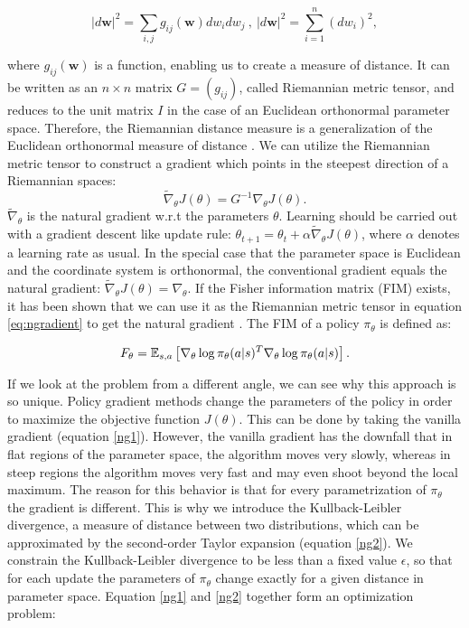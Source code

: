 \begin{equation}
	\label{eq:riem}
	|d\textbf{w}|^2 = \sum_{i,j}g_{ij}(\textbf{w}) dw_i dw_j ~,~ |d\textbf{w}|^2 = \sum_{i=1}^{n}(dw_i)^2,
\end{equation}

\noindent where $g_{ij}(\textbf{w})$ is a function, enabling us to create a measure of distance. It can be written as an $n \times n$ matrix $G = (g_{ij})$, called Riemannian metric tensor, and reduces to the unit matrix $I$ in the case of an Euclidean orthonormal parameter space. Therefore, the Riemannian distance measure is a generalization of the Euclidean orthonormal measure of distance \citep{haykin2009neural, amari1998natural}. We can utilize the Riemannian metric tensor to construct a gradient which points in the steepest direction of a Riemannian spaces:
\begin{equation}
	\label{eq:ngradient}
	\widetilde{\nabla}_{\theta} J(\theta) = G^{-1} \nabla_\theta J(\theta).
\end{equation}
$\widetilde{\nabla}_{\theta}$ is the natural gradient w.r.t the parameters $\theta$.  Learning should be carried out with a gradient descent like update rule: $\theta_{t+1} = \theta_{t} + \alpha \widetilde{\nabla}_{\theta} J(\theta)$, where $\alpha$ denotes a learning rate as usual. In the special case that the parameter space is Euclidean and the coordinate system is orthonormal, the conventional gradient equals the natural gradient: $\widetilde{\nabla}_{\theta} J(\theta) = \nabla_{\theta}$.
If the Fisher information matrix (FIM) exists, it has been shown that we can use it as the Riemannian metric tensor in equation \ref{eq:ngradient} to get the natural gradient \citep{peters2008natural, amari1998efficiently}. The FIM of a policy $\pi_{\theta}$ is defined as:

\begin{equation}
	F_\theta=\operatorname{\mathbb{E}}_{s,a}\left[\nabla_{\theta}\log\pi_{\theta}(a|s)^{T}\nabla_{\theta}\log\pi_{\theta}(a|s)\right].
\end{equation}

\noindent If we look at the problem from a different angle, we can see why this approach is so unique. Policy gradient methods change the parameters of the policy in order to maximize the objective function $J(\theta)$. This can be done by taking the vanilla gradient (equation \ref{ng1}). However, the vanilla gradient has the downfall that in flat regions of the parameter space, the algorithm moves very slowly, whereas in steep regions the algorithm moves very fast and may even shoot beyond the local maximum. The reason for this behavior is that for every parametrization of $\pi_{\theta}$ the gradient is different. This is why we introduce the Kullback-Leibler divergence, a measure of distance between two distributions, which can be approximated by the second-order Taylor expansion (equation \ref{ng2}). We constrain the Kullback-Leibler divergence to be less than a fixed value $\epsilon$, so that for each update the parameters of $\pi_\theta$ change exactly for a given distance in parameter space. Equation \ref{ng1} and \ref{ng2} together form an optimization problem:


